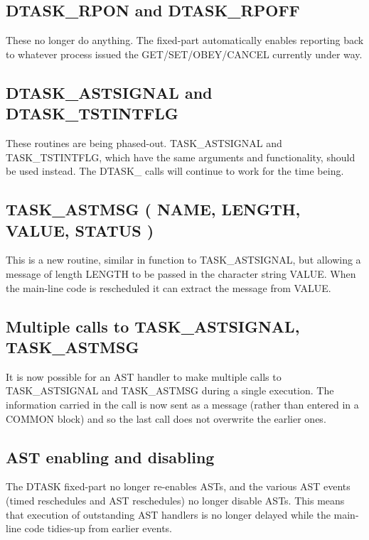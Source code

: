 \documentclass[twoside,11pt,nolof]{starlink}
\begin{document}
\subsection{DTASK\_RPON and DTASK\_RPOFF}

These no longer do anything. The fixed-part automatically enables
reporting back to whatever process issued the GET/SET/OBEY/CANCEL
currently under way.

\subsection{DTASK\_ASTSIGNAL and DTASK\_TSTINTFLG}

These routines are being phased-out. TASK\_ASTSIGNAL
and TASK\_TSTINTFLG, which have the same arguments and functionality, should
be used instead.
The DTASK\_ calls will continue to work for the time being.

\subsection{TASK\_ASTMSG ( NAME, LENGTH, VALUE, STATUS )}

This is a new routine, similar in function to TASK\_ASTSIGNAL, but
allowing a message of length LENGTH to be passed in the character string
VALUE. When the main-line code is rescheduled it can extract the message
from VALUE.

\subsection{Multiple calls to TASK\_ASTSIGNAL, TASK\_ASTMSG}

It is now possible for an AST handler to make
multiple calls to TASK\_ASTSIGNAL and TASK\_ASTMSG during a single execution.
The information carried in the call is now sent as a message (rather than
entered in a COMMON block) and so the last call does not overwrite the earlier
ones.

\subsection{AST enabling and disabling}

The DTASK fixed-part no longer re-enables ASTs, and the various AST
events (timed reschedules and AST reschedules) no longer disable ASTs.
This means that execution of outstanding AST handlers is no longer
delayed while the main-line code tidies-up from earlier events.
\end{document}
